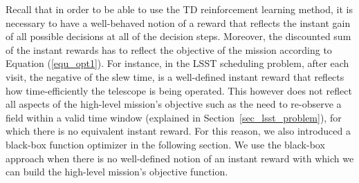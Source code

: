 \documentclass[12pt]{aastex62}
\theoremstyle{definition}
\begin{document}
Recall that in order to be able to use the TD reinforcement learning method, it is necessary to have a well-behaved notion of a reward that reflects the instant gain of all possible decisions at all of the decision steps. Moreover, the discounted sum of the instant rewards has to reflect the objective of the mission according to Equation (\ref{equ_opt1}). For instance, in the LSST scheduling problem, after each visit, the negative of the slew time, is a well-defined instant reward that reflects how time-efficiently the telescope is being operated. This however does not reflect all aspects of the high-level mission's objective such as the need to re-observe a field within a valid time window (explained in Section~\ref{sec_lsst_problem}), for which there is no equivalent instant reward. For this reason, we also introduced a black-box function optimizer in the following section. We use the black-box approach when there is no well-defined notion of an instant reward with which we can build the high-level mission's objective function.
\end{document}
